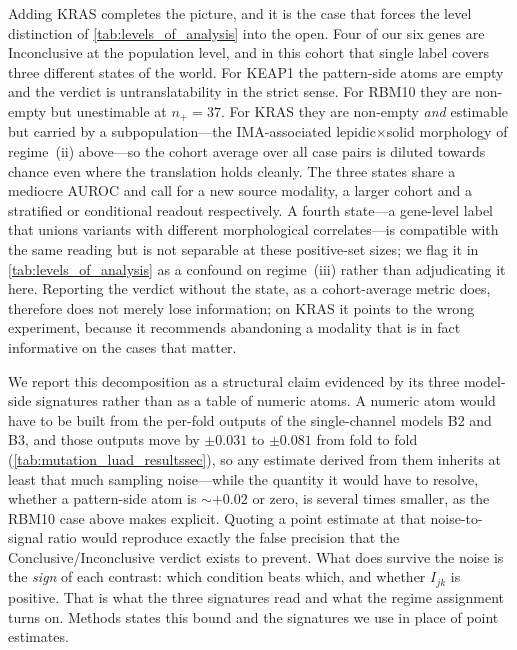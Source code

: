 Adding KRAS completes the picture, and it is the case that forces
the level distinction of \cref{tab:levels_of_analysis} into the
open.
Four of our six genes are Inconclusive at the population level, and
in this cohort that single label covers three different states of the
world.
For KEAP1 the pattern-side atoms are empty and the verdict is
untranslatability in the strict sense.
For RBM10 they are non-empty but unestimable at $n_+ = 37$.
For KRAS they are non-empty \emph{and} estimable but carried by a
subpopulation---the IMA-associated lepidic$\times$solid morphology of
regime~(ii) above---so the cohort average over all case pairs is
diluted towards chance even where the translation holds cleanly.
The three states share a mediocre AUROC and call for a new source
modality, a larger cohort and a stratified or
conditional readout respectively.
A fourth state---a gene-level label that unions variants with different
morphological correlates---is compatible with the same reading but is
not separable at these positive-set sizes; we flag it in
\cref{tab:levels_of_analysis} as a confound on regime~(iii) rather than
adjudicating it here.
Reporting the verdict without the state, as a cohort-average metric
does, therefore does not merely lose information; on KRAS it points
to the wrong experiment, because it recommends abandoning a
modality that is in fact informative on the cases that matter.

We report this decomposition as a structural claim evidenced by its
three model-side signatures rather than as a table of numeric atoms.
A numeric atom would have to be built from the per-fold outputs of the
single-channel models B2 and B3, and those outputs move by $\pm 0.031$
to $\pm 0.081$ from fold to fold
(\cref{tab:mutation_luad_resultssec}), so any estimate derived from
them inherits at least that much sampling noise---while the quantity it
would have to resolve, whether a pattern-side atom is ${\sim}{+}0.02$
or zero, is several times smaller, as the RBM10 case above makes
explicit. Quoting a point estimate at that noise-to-signal ratio would
reproduce exactly the false precision that the
Conclusive/Inconclusive verdict exists to prevent.
What does survive the noise is the \emph{sign} of each contrast: which
condition beats which, and whether $I_{jk}$ is positive. That is what
the three signatures read and what the regime assignment turns on.
Methods states this bound and the signatures we use in place of point
estimates.

